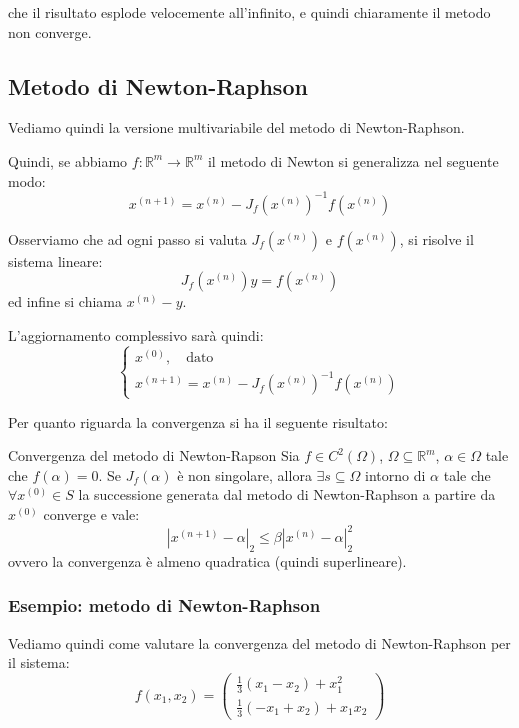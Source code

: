 \documentclass[a4paper,11pt]{article}
\begin{document}
\begin{itemize}
\begin{center}
		\end{center}
		che il risultato esplode velocemente all'infinito, e quindi chiaramente il metodo non converge.
\end{itemize}

\subsection{Metodo di Newton-Raphson}
Vediamo quindi la versione multivariabile del metodo di Newton-Raphson.

Quindi, se abbiamo $f : \mathbb{R}^m \rightarrow \mathbb{R}^m$ il metodo di Newton si generalizza nel seguente modo:
$$
x^{(n + 1)} = x^{(n)} - J_f (x^{(n)})^{-1} f(x^{(n)})
$$

Osserviamo che ad ogni passo si valuta $J_f(x^{(n)})$ e $f(x^{(n)})$, si risolve il sistema lineare:
$$
J_f(x^{(n)}) y = f(x^{(n)})
$$
ed infine si chiama $x^{(n)} - y$.

L'aggiornamento complessivo sarà quindi:
\[
	\begin{cases}
		x^{(0)}, \quad \text{dato} \\
		x^{(n + 1)} = x^{(n)} - J_f(x^{(n)})^{-1} f(x^{(n)})
	\end{cases}
\]

Per quanto riguarda la convergenza si ha il seguente risultato:
\begin{theorem}{Convergenza del metodo di Newton-Rapson}
	Sia $f \in C^2(\Omega)$, $\Omega \subseteq \mathbb{R}^m$, $\alpha \in \Omega$ tale che $f(\alpha) = 0$.
	Se $J_f(\alpha)$ è non singolare, allora $\exists s \subseteq \Omega$ intorno di $\alpha$ tale che $\forall x^{(0)} \in S$ la successione generata dal metodo di Newton-Raphson a partire da $x^{(0)}$ converge e vale:
	$$
	|x^{(n + 1)} - \alpha|_2 \leq \beta |x^{(n)} - \alpha |_2^2
	$$
	ovvero la convergenza è almeno quadratica (quindi superlineare).
\end{theorem}

\subsubsection{Esempio: metodo di Newton-Raphson}
Vediamo quindi come valutare la convergenza del metodo di Newton-Raphson per il sistema:
$$
f(x_1, x_2) =
\begin{pmatrix}
	\frac{1}{3} (x_1 - x_2) + x_1^2 \\
	\frac{1}{3} (-x_1 + x_2) + x_1 x_2
\end{pmatrix}
$$
\end{document}
